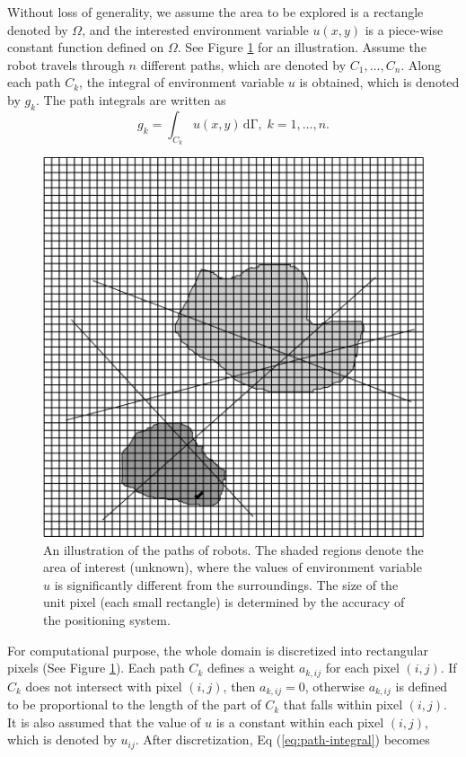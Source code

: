 \documentclass[english]{article}\usepackage[]{graphicx}\usepackage[]{color}
\begin{document}
Without loss of generality, we assume the area to be explored is a
rectangle denoted by $\Omega$, and the interested environment variable
$u(x,y)$ is a piece-wise constant function defined on $\Omega$.
See Figure \ref{fig:An-illustration-of-paths} for an illustration.
Assume the robot travels through $n$ different paths, which are denoted
by $C_{1},\ldots,C_{n}$. Along each path $C_{k}$, the integral of
environment variable $u$ is obtained, which is denoted by $g_{k}$.
The path integrals are written as
\begin{equation}
g_{k}=\int_{C_{k}}u(x,y)\mathrm{\,{d}\Gamma},\; k=1,\ldots,n.\label{eq:path-integral}
\end{equation}


\begin{figure}[h]
\begin{centering}

\includegraphics[width=0.5\linewidth]{figures/path-illustration}
\par\end{centering}

\caption{\label{fig:An-illustration-of-paths}An illustration of the paths
of robots. The shaded regions denote the area of interest (unknown),
where the values of environment variable $u$ is significantly different
from the surroundings. The size of the unit pixel (each small rectangle)
is determined by the accuracy of the positioning system.}
\end{figure}


For computational purpose, the whole domain is discretized into rectangular
pixels (See Figure \ref{fig:An-illustration-of-paths}). Each path
$C_{k}$ defines a weight $a_{k,ij}$ for each pixel $(i,j)$. If
$C_{k}$ does not intersect with pixel $(i,j)$, then $a_{k,ij}=0$,
otherwise $a_{k,ij}$ is defined to be proportional to the length
of the part of $C_{k}$ that falls within pixel $(i,j)$. It is also
assumed that the value of $u$ is a constant within each pixel $(i,j)$,
which is denoted by $u_{ij}$. After discretization, Eq (\ref{eq:path-integral})
becomes
\end{document}
